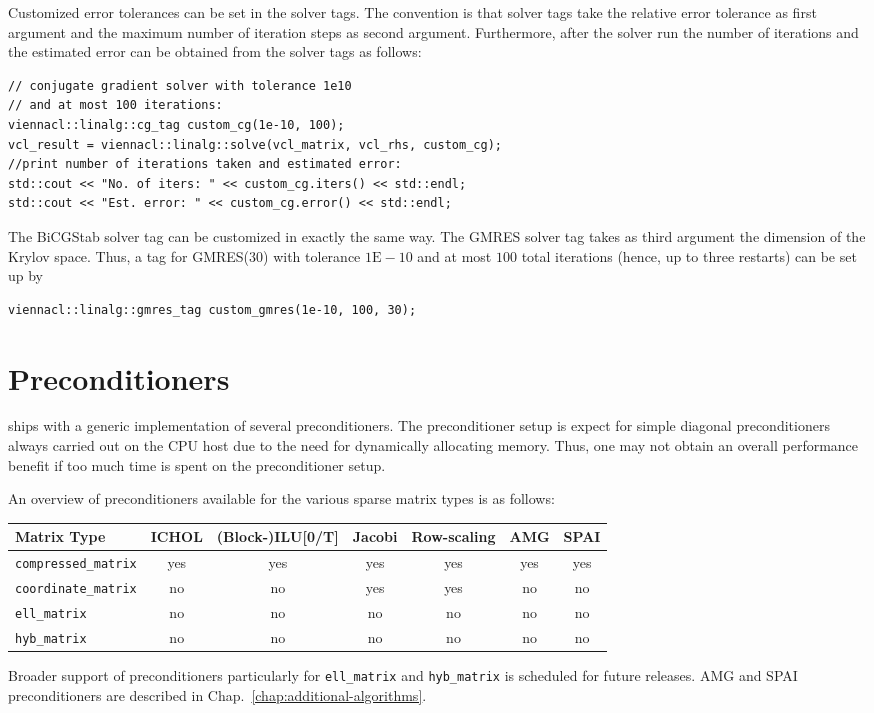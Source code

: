Customized error tolerances can be set in the solver tags. The convention is
that solver tags take the relative error tolerance as first argument and the
maximum number of iteration steps as second argument. Furthermore, after the
solver run the number of iterations and the estimated error can be obtained from
the solver tags as follows:
\begin{lstlisting}
// conjugate gradient solver with tolerance 1e10
// and at most 100 iterations:
viennacl::linalg::cg_tag custom_cg(1e-10, 100);
vcl_result = viennacl::linalg::solve(vcl_matrix, vcl_rhs, custom_cg);
//print number of iterations taken and estimated error:
std::cout << "No. of iters: " << custom_cg.iters() << std::endl;
std::cout << "Est. error: " << custom_cg.error() << std::endl;
\end{lstlisting}
The BiCGStab solver tag can be customized in exactly the same way. The GMRES
solver tag takes as third argument the dimension of the Krylov space. Thus, a
tag for GMRES(30) with tolerance $1\mathrm{E}\!-\!10$ and at most $100$ total
iterations
(hence, up to three restarts) can be set up by
\begin{lstlisting}
viennacl::linalg::gmres_tag custom_gmres(1e-10, 100, 30);
\end{lstlisting}

\section{Preconditioners} \label{sec:preconditioner}
{\ViennaCL} ships with a generic implementation of several preconditioners.
The preconditioner setup is expect for simple diagonal preconditioners always carried out on the CPU host due to the need for dynamically allocating memory.
Thus, one may not obtain an overall performance benefit if too much time is spent on the preconditioner setup.


An overview of preconditioners available for the various sparse matrix types is as follows:
\begin{center}
 \begin{tabular}{|l|c|c|c|c|c|c|}
  \hline
  Matrix Type & ICHOL & (Block-)ILU[0/T] & Jacobi & Row-scaling & AMG & SPAI \\
  \hline
  \lstinline|compressed_matrix| & yes & yes & yes & yes & yes & yes \\
  \lstinline|coordinate_matrix| & no & no & yes & yes & no & no \\
  \lstinline|ell_matrix| & no & no & no & no & no & no \\
  \lstinline|hyb_matrix| & no & no & no & no & no & no \\
  \hline
 \end{tabular}
\end{center}
Broader support of preconditioners particularly for \lstinline|ell_matrix| and \lstinline|hyb_matrix| is scheduled for future releases.
AMG and SPAI preconditioners are described in Chap.~\ref{chap:additional-algorithms}.


